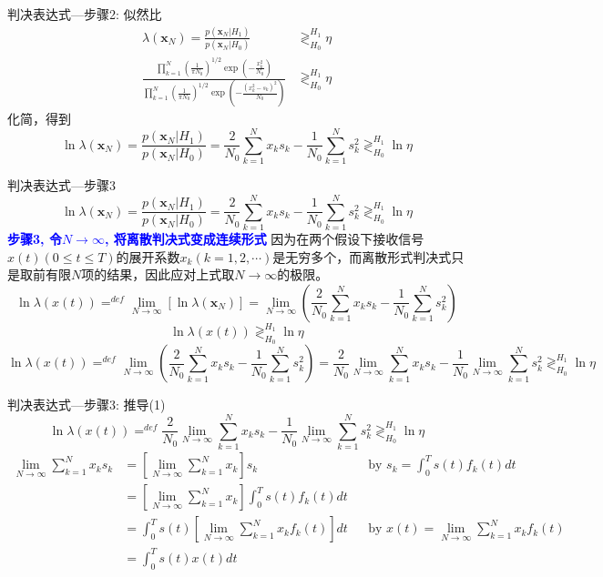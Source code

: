 \begin{frame}[shrink]{判决表达式---步骤2: 似然比}
\begin{align*}
\lambda(\bm{x}_N)=\frac{p(\bm{x}_N|H_1)}{p(\bm{x}_N|H_0)}&\mathop{\gtrless}_{H_0}^{H_1}\eta\\
\frac{\prod\limits_{k=1}^{N}\left(\frac{1}{\pi N_0}\right)^{1/2}\exp\left(-\frac{x_k^2}{N_0}\right)}
{\prod\limits_{k=1}^{N}\left(\frac{1}{\pi N_0}\right)^{1/2}\exp\left(-\frac{(x_k^2-s_k)^2}{N_0}\right)}&\mathop{\gtrless}_{H_0}^{H_1}\eta
\end{align*}
化简，得到
\[\ln\lambda(\bm{x}_N)=\frac{p(\bm{x}_N|H_1)}{p(\bm{x}_N|H_0)}=\frac{2}{N_0}\sum\limits_{k=1}^{N}x_ks_k-\frac{1}{N_0}\sum\limits_{k=1}^{N}s_k^2\mathop{\gtrless}_{H_0}^{H_1}\ln\eta \]

\end{frame}

\begin{frame}[shrink]{判决表达式---步骤3}
\[\ln\lambda(\bm{x}_N)=\frac{p(\bm{x}_N|H_1)}{p(\bm{x}_N|H_0)}=\frac{2}{N_0}\sum\limits_{k=1}^{N}x_ks_k-\frac{1}{N_0}\sum\limits_{k=1}^{N}s_k^2\mathop{\gtrless}_{H_0}^{H_1}\ln\eta \]
\textbf{\textcolor{blue}{步骤3, 令$N\to\infty$, 将离散判决式变成连续形式}}
因为在两个假设下接收信号$x(t)(0\le t\le T)$的展开系数$x_k(k=1,2,\cdots)$是无穷多个，而离散形式判决式只是取前有限$N$项的结果，因此应对上式取$N\to\infty$的极限。
\[\ln\lambda(x(t))\mathop{=}^{def}\lim\limits_{N\to\infty}[\ln\lambda(\bm{x}_N)]=\lim\limits_{N\to\infty}\left(\frac{2}{N_0}\sum\limits_{k=1}^{N}x_ks_k-\frac{1}{N_0}\sum\limits_{k=1}^{N}s_k^2\right) \]
\[\ln\lambda(x(t))\mathop{\gtrless}_{H_0}^{H_1}\ln\eta \]
\[\ln\lambda(x(t))\mathop{=}^{def}\lim\limits_{N\to\infty}\left(\frac{2}{N_0}\sum\limits_{k=1}^{N}x_ks_k-\frac{1}{N_0}\sum\limits_{k=1}^{N}s_k^2\right)=
\frac{2}{N_0}\lim\limits_{N\to\infty}\sum\limits_{k=1}^{N}x_ks_k-\frac{1}{N_0}\lim\limits_{N\to\infty}\sum\limits_{k=1}^{N}s_k^2\mathop{\gtrless}_{H_0}^{H_1}\ln\eta \]
\end{frame}

\begin{frame}{判决表达式---步骤3: 推导(1)}
\[\ln\lambda(x(t))\mathop{=}^{def}
\frac{2}{N_0}\lim\limits_{N\to\infty}\sum\limits_{k=1}^{N}x_ks_k-\frac{1}{N_0}\lim\limits_{N\to\infty}\sum\limits_{k=1}^{N}s_k^2\mathop{\gtrless}_{H_0}^{H_1}\ln\eta \]
\begin{align*}
\lim\limits_{N\to\infty}\sum\limits_{k=1}^{N}x_ks_k&=\left[\lim\limits_{N\to\infty}\sum\limits_{k=1}^{N}x_k\right]s_k &&\text{by }s_k=\int_{0}^{T}s(t)f_k(t)dt \\
&=\left[\lim\limits_{N\to\infty}\sum\limits_{k=1}^{N}x_k\right]\int_{0}^{T}s(t)f_k(t)dt\\
&=\int_{0}^{T}s(t)\left[\lim\limits_{N\to\infty}\sum\limits_{k=1}^{N}x_kf_k(t)\right]dt &&\text{by }x(t)=\lim\limits_{N\to\infty}\sum\limits_{k=1}^Nx_kf_k(t)\\
&=\int_{0}^{T}s(t)x(t)dt
\end{align*}
\end{frame}

